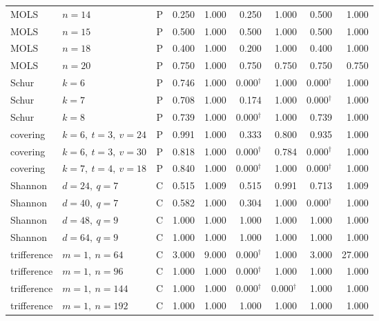 \begin{longtable}{@{}P{.21\linewidth}P{.21\linewidth}rrrrrrr@{}}
MOLS & $n=14$ & P & 0.250 & 1.000 & 0.250 & 1.000 & 0.500 & 1.000 \\
MOLS & $n=15$ & P & 0.500 & 1.000 & 0.500 & 1.000 & 0.500 & 1.000 \\
MOLS & $n=18$ & P & 0.400 & 1.000 & 0.200 & 1.000 & 0.400 & 1.000 \\
MOLS & $n=20$ & P & 0.750 & 1.000 & 0.750 & 0.750 & 0.750 & 0.750 \\
\addlinespace[2pt]
Schur & $k=6$ & P & 0.746 & 1.000 & 0.000$^{\dagger}$ & 1.000 & 0.000$^{\dagger}$ & 1.000 \\
Schur & $k=7$ & P & 0.708 & 1.000 & 0.174 & 1.000 & 0.000$^{\dagger}$ & 1.000 \\
Schur & $k=8$ & P & 0.739 & 1.000 & 0.000$^{\dagger}$ & 1.000 & 0.739 & 1.000 \\
\addlinespace[2pt]
covering & $k=6,\ t=3,\ v=24$ & P & 0.991 & 1.000 & 0.333 & 0.800 & 0.935 & 1.000 \\
covering & $k=6,\ t=3,\ v=30$ & P & 0.818 & 1.000 & 0.000$^{\dagger}$ & 0.784 & 0.000$^{\dagger}$ & 1.000 \\
covering & $k=7,\ t=4,\ v=18$ & P & 0.840 & 1.000 & 0.000$^{\dagger}$ & 1.000 & 0.000$^{\dagger}$ & 1.000 \\
\addlinespace[2pt]
Shannon & $d=24,\ q=7$ & C & 0.515 & 1.009 & 0.515 & 0.991 & 0.713 & 1.009 \\
Shannon & $d=40,\ q=7$ & C & 0.582 & 1.000 & 0.304 & 1.000 & 0.000$^{\dagger}$ & 1.000 \\
Shannon & $d=48,\ q=9$ & C & 1.000 & 1.000 & 1.000 & 1.000 & 1.000 & 1.000 \\
Shannon & $d=64,\ q=9$ & C & 1.000 & 1.000 & 1.000 & 1.000 & 1.000 & 1.000 \\
\addlinespace[2pt]
trifference & $m=1,\ n=64$ & C & 3.000 & 9.000 & 0.000$^{\dagger}$ & 1.000 & 3.000 & 27.000 \\
trifference & $m=1,\ n=96$ & C & 1.000 & 1.000 & 0.000$^{\dagger}$ & 1.000 & 1.000 & 1.000 \\
trifference & $m=1,\ n=144$ & C & 1.000 & 1.000 & 0.000$^{\dagger}$ & 0.000$^{\dagger}$ & 1.000 & 1.000 \\
trifference & $m=1,\ n=192$ & C & 1.000 & 1.000 & 1.000 & 1.000 & 1.000 & 1.000 \\
\end{longtable}
